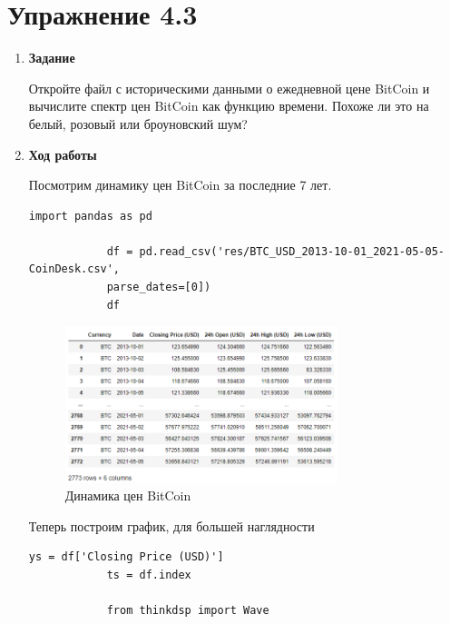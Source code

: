 \documentclass[a4paper,12pt]{article}
\begin{document}
	
	\section{Упражнение 4.3}
	
	\begin{enumerate}
		
		\item \textbf{Задание}
		
		Откройте файл с историческими данными о ежедневной цене BitCoin и вычислите спектр цен BitCoin как функцию времени. Похоже ли это на белый, розовый или броуновский шум?
		
		
		\item \textbf{Ход работы}
		
		Посмотрим динамику цен BitCoin за последние 7 лет.
		
		\begin{lstlisting}[caption=Считывание динамики цен BitCoin]
			import pandas as pd
			
			df = pd.read_csv('res/BTC_USD_2013-10-01_2021-05-05-CoinDesk.csv', 
			parse_dates=[0])
			df
		\end{lstlisting}
		\begin{figure}[H]
			\centering
			\includegraphics[width=0.75\textwidth]{3_1.png}
			\caption{Динамика цен BitCoin}
			\label{fig:3.1}
		\end{figure}
		
		Теперь построим график, для большей наглядности
		\begin{lstlisting}[caption=Построение графика цен BitCoin]
			ys = df['Closing Price (USD)']
			ts = df.index
			
			from thinkdsp import Wave
			

\end{lstlisting}
\end{enumerate}
\end{document}
